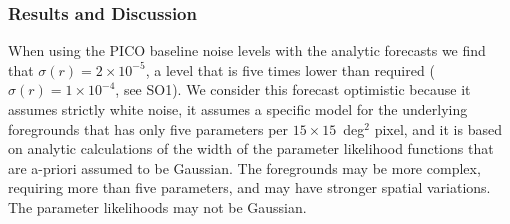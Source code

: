 \documentclass[PICOReport.tex]{subfiles}
\begin{document}



\subsubsection{Results and Discussion}
\label{sec:foregrounds_results}

When using the PICO baseline noise levels with the analytic forecasts we find that $\sigma(r) = 2\times 10^{-5}$, a level that is five times lower than required ($\sigma(r) =1 \times 10^{-4}$, see SO1). We consider this forecast optimistic because it assumes strictly white noise, it assumes a specific model for the underlying foregrounds that has only five parameters per $15 \times 15$~deg$^{2}$ pixel, and it is based on analytic calculations of the width of the parameter likelihood functions that are a-priori assumed to be Gaussian. The foregrounds may be more complex, requiring more than five parameters, and may have stronger spatial variations. The parameter likelihoods may not be Gaussian. 
\end{document}
